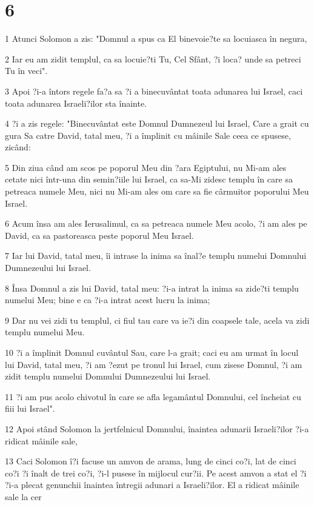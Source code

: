 \chapter{6}

\par 1 Atunci Solomon a zis: "Domnul a spus ca El binevoie?te sa locuiasca în negura,
\par 2 Iar eu am zidit templul, ca sa locuie?ti Tu, Cel Sfânt, ?i loca? unde sa petreci Tu în veci".
\par 3 Apoi ?i-a întors regele fa?a sa ?i a binecuvântat toata adunarea lui Israel, caci toata adunarea Israeli?ilor sta înainte.
\par 4 ?i a zis regele: "Binecuvântat este Domnul Dumnezeul lui Israel, Care a grait cu gura Sa catre David, tatal meu, ?i a împlinit cu mâinile Sale ceea ce spusese, zicând:
\par 5 Din ziua când am scos pe poporul Meu din ?ara Egiptului, nu Mi-am ales cetate nici într-una din semin?iile lui Israel, ca sa-Mi zidesc templu în care sa petreaca numele Meu, nici nu Mi-am ales om care sa fie cârmuitor poporului Meu Israel.
\par 6 Acum însa am ales Ierusalimul, ca sa petreaca numele Meu acolo, ?i am ales pe David, ca sa pastoreasca peste poporul Meu Israel.
\par 7 Iar lui David, tatal meu, îi intrase la inima sa înal?e templu numelui Domnului Dumnezeului lui Israel.
\par 8 Însa Domnul a zis lui David, tatal meu: ?i-a intrat la inima sa zide?ti templu numelui Meu; bine e ca ?i-a intrat acest lucru la inima;
\par 9 Dar nu vei zidi tu templul, ci fiul tau care va ie?i din coapsele tale, acela va zidi templu numelui Meu.
\par 10 ?i a împlinit Domnul cuvântul Sau, care l-a grait; caci eu am urmat în locul lui David, tatal meu, ?i am ?ezut pe tronul lui Israel, cum zisese Domnul, ?i am zidit templu numelui Domnului Dumnezeului lui Israel.
\par 11 ?i am pus acolo chivotul în care se afla legamântul Domnului, cel încheiat cu fiii lui Israel".
\par 12 Apoi stând Solomon la jertfelnicul Domnului, înaintea adunarii Israeli?ilor ?i-a ridicat mâinile sale,
\par 13 Caci Solomon î?i facuse un amvon de arama, lung de cinci co?i, lat de cinci co?i ?i înalt de trei co?i, ?i-l pusese în mijlocul cur?ii. Pe acest amvon a stat el ?i ?i-a plecat genunchii înaintea întregii adunari a Israeli?ilor. El a ridicat mâinile sale la cer
